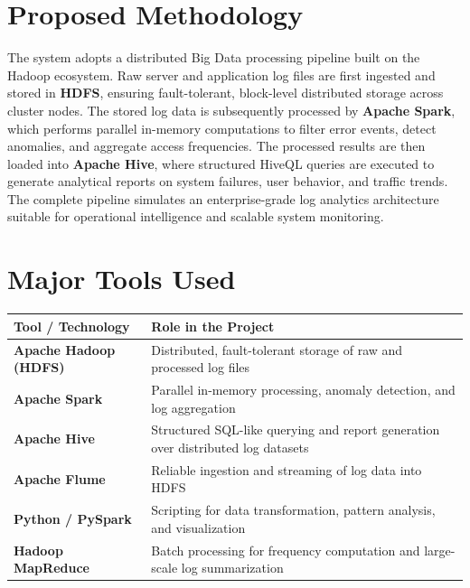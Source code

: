 \documentclass[12pt, a4paper]{article}
\begin{document}
\section*{Proposed Methodology}
The system adopts a distributed Big Data processing pipeline built on the Hadoop ecosystem. Raw server and application log files are first ingested and stored in \textbf{HDFS}, ensuring fault-tolerant, block-level distributed storage across cluster nodes. The stored log data is subsequently processed by \textbf{Apache Spark}, which performs parallel in-memory computations to filter error events, detect anomalies, and aggregate access frequencies. The processed results are then loaded into \textbf{Apache Hive}, where structured HiveQL queries are executed to generate analytical reports on system failures, user behavior, and traffic trends. The complete pipeline simulates an enterprise-grade log analytics architecture suitable for operational intelligence and scalable system monitoring.

\section*{Major Tools Used}

\begin{table}[h!]
\centering
\renewcommand{\arraystretch}{1.5}
\begin{tabularx}{\textwidth}{|l|X|}
\hline
\textbf{Tool / Technology} & \textbf{Role in the Project} \\ \hline
\textbf{Apache Hadoop (HDFS)} & Distributed, fault-tolerant storage of raw and processed log files \\ \hline
\textbf{Apache Spark} & Parallel in-memory processing, anomaly detection, and log aggregation \\ \hline
\textbf{Apache Hive} & Structured SQL-like querying and report generation over distributed log datasets \\ \hline
\textbf{Apache Flume} & Reliable ingestion and streaming of log data into HDFS \\ \hline
\textbf{Python / PySpark} & Scripting for data transformation, pattern analysis, and visualization \\ \hline
\textbf{Hadoop MapReduce} & Batch processing for frequency computation and large-scale log summarization \\ \hline
\end{tabularx}
\end{table}
\end{document}
